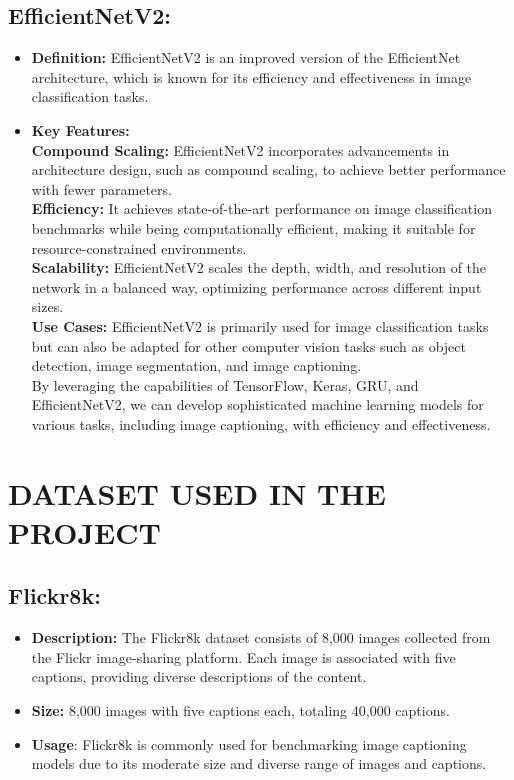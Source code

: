 \documentclass[oneside,a4paper,12pt]{report}
\begin{document}
\subsection{EfficientNetV2:}
\begin{itemize}


\item{\textbf{Definition:}} EfficientNetV2 is an improved version of the EfficientNet architecture, which is known for its efficiency and effectiveness in image classification tasks.
\item{\textbf{Key Features:}}\\
\textbf{Compound Scaling:} EfficientNetV2 incorporates advancements in architecture design, such as compound scaling, to achieve better performance with fewer parameters.\\
\textbf{Efficiency: }It achieves state-of-the-art performance on image classification benchmarks while being computationally efficient, making it suitable for resource-constrained environments.\\
\textbf{Scalability:} EfficientNetV2 scales the depth, width, and resolution of the network in a balanced way, optimizing performance across different input sizes.\\
\textbf{Use Cases:} EfficientNetV2 is primarily used for image classification tasks but can also be adapted for other computer vision tasks such as object detection, image segmentation, and image captioning.\\
By leveraging the capabilities of TensorFlow, Keras, GRU, and EfficientNetV2, we can develop sophisticated machine learning models for various tasks, including image captioning, with efficiency and effectiveness.
\end{itemize}


\section{DATASET USED IN THE PROJECT}
\subsection{Flickr8k:}
\begin{itemize}
\item{\textbf{Description:} }The Flickr8k dataset consists of 8,000 images collected from the Flickr image-sharing platform. Each image is associated with five captions, providing diverse descriptions of the content.
\item{\textbf{Size:} }8,000 images with five captions each, totaling 40,000 captions.
\item{\textbf{Usage}: }Flickr8k is commonly used for benchmarking image captioning models due to its moderate size and diverse range of images and captions.

\end{itemize}
\end{document}
